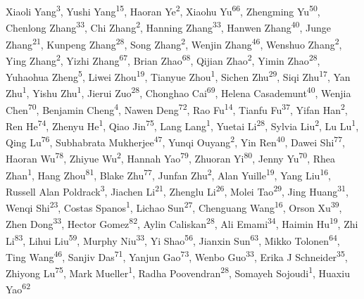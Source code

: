\documentclass{llmxive}
\begin{document}
Xiaoli Yang\textsuperscript{3}, Yushi Yang\textsuperscript{15}, Haoran Ye\textsuperscript{2}, Xiaohu Yu\textsuperscript{66}, Zhengming Yu\textsuperscript{50}, Chenlong Zhang\textsuperscript{33}, Chi Zhang\textsuperscript{2}, Hanning Zhang\textsuperscript{33}, Hanwen Zhang\textsuperscript{40}, Junge Zhang\textsuperscript{21}, Kunpeng Zhang\textsuperscript{28}, Song Zhang\textsuperscript{2}, Wenjin Zhang\textsuperscript{46}, Wenshuo Zhang\textsuperscript{2}, Ying Zhang\textsuperscript{2}, Yizhi Zhang\textsuperscript{67}, Brian Zhao\textsuperscript{68}, Qijian Zhao\textsuperscript{2}, Yimin Zhao\textsuperscript{28}, Yuhaohua Zheng\textsuperscript{5}, Liwei Zhou\textsuperscript{19}, Tianyue Zhou\textsuperscript{1}, Sichen Zhu\textsuperscript{29}, Siqi Zhu\textsuperscript{17}, Yan Zhu\textsuperscript{1}, Yishu Zhu\textsuperscript{1}, Jierui Zuo\textsuperscript{28}, Chonghao Cai\textsuperscript{69}, Helena Casademunt\textsuperscript{40}, Wenjia Chen\textsuperscript{70}, Benjamin Cheng\textsuperscript{4}, Nawen Deng\textsuperscript{72}, Rao Fu\textsuperscript{14}, Tianfu Fu\textsuperscript{37}, Yifan Han\textsuperscript{2}, Ren He\textsuperscript{74}, Zhenyu He\textsuperscript{1}, Qiao Jin\textsuperscript{75}, Lang Lang\textsuperscript{1}, Yuetai Li\textsuperscript{28}, Sylvia Liu\textsuperscript{2}, Lu Lu\textsuperscript{1}, Qing Lu\textsuperscript{76}, Subhabrata Mukherjee\textsuperscript{47}, Yunqi Ouyang\textsuperscript{2}, Yin Ren\textsuperscript{40}, Dawei Shi\textsuperscript{77}, Haoran Wu\textsuperscript{78}, Zhiyue Wu\textsuperscript{2}, Hannah Yao\textsuperscript{79}, Zhuoran Yi\textsuperscript{80}, Jenny Yu\textsuperscript{70}, Rhea Zhan\textsuperscript{1}, Hang Zhou\textsuperscript{81}, Blake Zhu\textsuperscript{77}, Junfan Zhu\textsuperscript{2}, Alan Yuille\textsuperscript{19}, Yang Liu\textsuperscript{16}, Russell Alan Poldrack\textsuperscript{3}, Jiachen Li\textsuperscript{21}, Zhenglu Li\textsuperscript{26}, Molei Tao\textsuperscript{29}, Jing Huang\textsuperscript{31}, Wenqi Shi\textsuperscript{23}, Costas Spanos\textsuperscript{1}, Lichao Sun\textsuperscript{27}, Chenguang Wang\textsuperscript{16}, Orson Xu\textsuperscript{39}, Zhen Dong\textsuperscript{33}, Hector Gomez\textsuperscript{82}, Aylin Caliskan\textsuperscript{28}, Ali Emami\textsuperscript{34}, Haimin Hu\textsuperscript{19}, Zhi Li\textsuperscript{83}, Lihui Liu\textsuperscript{59}, Murphy Niu\textsuperscript{33}, Yi Shao\textsuperscript{56}, Jianxin Sun\textsuperscript{63}, Mikko Tolonen\textsuperscript{64}, Ting Wang\textsuperscript{46}, Sanjiv Das\textsuperscript{71}, Yanjun Gao\textsuperscript{73}, Wenbo Guo\textsuperscript{33}, Erika J Schneider\textsuperscript{35}, Zhiyong Lu\textsuperscript{75}, Mark Mueller\textsuperscript{1}, Radha Poovendran\textsuperscript{28}, Somayeh Sojoudi\textsuperscript{1}, Huaxiu Yao\textsuperscript{62}\par
\vspace{4pt}
\end{document}

